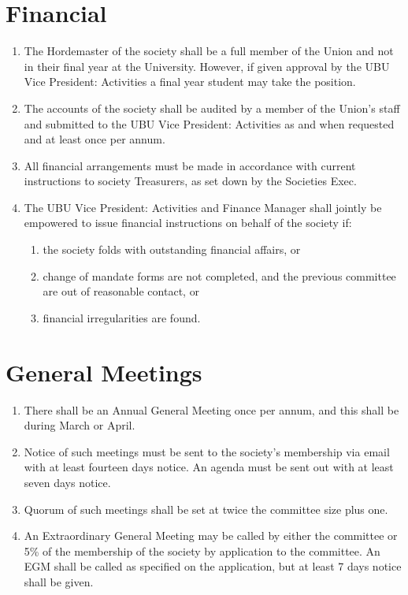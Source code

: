 \documentclass[a4paper,10pt]{article}
\begin{document}
\section{Financial}
\begin{enumerate}
  \item The Hordemaster of the society shall be a full member of the Union and not in their final year at the University. However, if given approval by the UBU Vice President: Activities a final year student may take the position.
  \item The accounts of the society shall be audited by a member of the Union's staff and submitted to the UBU Vice President: Activities as and when requested and at least once per annum.
  \item All financial arrangements must be made in accordance with current instructions to society Treasurers, as set down by the Societies Exec.
  \item The UBU Vice President: Activities and Finance Manager shall jointly be empowered to issue financial instructions on behalf of the society if:
  \begin{enumerate}
    \item the society folds with outstanding financial affairs, or
    \item change of mandate forms are not completed, and the previous committee are out of reasonable contact, or
    \item financial irregularities are found.
  \end{enumerate}
\end{enumerate}

\section{General Meetings}
\begin{enumerate}
  \item There shall be an Annual General Meeting once per annum, and this shall be during March or April.
  \item Notice of such meetings must be sent to the society's membership via email with at least fourteen days notice. An agenda must be sent out with at least seven days notice.
  \item Quorum of such meetings shall be set at twice the committee size plus one.
  \item An Extraordinary General Meeting may be called by either the committee or 5\% of the membership of the society by application to the committee. An EGM shall be called as specified on the application, but at least 7 days notice shall be given.
\end{enumerate}
\end{document}
